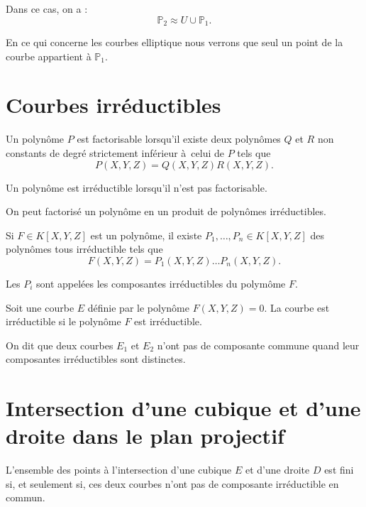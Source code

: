 Dans ce cas, on a :
\[
\mathbb{P}_{2} \approx U \cup \mathbb{P}_{1}
.\] 


\begin{remarque}
    En ce qui concerne les courbes elliptique nous verrons que seul un point de la courbe
    appartient à $\mathbb{P}_{1}$.
\end{remarque}

\section{Courbes irréductibles}

\begin{definition}
    \label{def:polyIrr}
    Un polynôme $P$ est factorisable lorsqu'il existe deux polynômes $Q$ et $R$ non
    constants de degré strictement inférieur à celui de $P$ tels que
    \[
    P(X,Y,Z) = Q(X,Y,Z)R(X,Y,Z)
    .\] 

    Un polynôme est irréductible lorsqu'il n'est pas factorisable.

    On peut factorisé un polynôme en un produit de polynômes irréductibles. 

    Si $F
    \in K[X,Y,Z]$ est un polynôme, il existe $P_1,\ldots,P_{n} \in K[X,Y,Z]$ des polynômes
    tous
    irréductible tels que
    \[
    F(X,Y,Z)= P_1(X,Y,Z)\ldots P_{n}(X,Y,Z)
    .\] 

    Les $P_{i}$ sont appelées les composantes irréductibles du polymôme $F$.
\end{definition}

\begin{definition}
    \label{def:courbeIrr}
    
    Soit une courbe $E$ définie par le polynôme $F(X,Y,Z) = 0$. La courbe est irréductible si
    le polynôme $F$ est irréductible.
\end{definition}

On dit que deux courbes $E_1$ et $E_2$ n'ont pas de composante commune quand leur
composantes irréductibles sont distinctes.

\section{Intersection d'une cubique et d'une droite dans le plan projectif}

\begin{proposition}
    \label{prop:intersectionED}
    
    L'ensemble des points à l'intersection d'une cubique $E$ et d'une droite $D$ est fini si, et
    seulement si, ces deux courbes n'ont pas de composante irréductible en commun.
\end{proposition}

